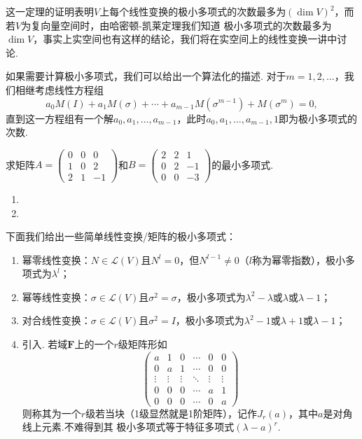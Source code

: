 这一定理的证明表明$V$上每个线性变换的极小多项式的次数最多为$(\dim V)^2$，而若$V$为复向量空间时，由哈密顿-凯莱定理我们知道
极小多项式的次数最多为$\dim V$，事实上实空间也有这样的结论，我们将在实空间上的线性变换一讲中讨论.

如果需要计算极小多项式，我们可以给出一个算法化的描述. 对于$m=1,2,\ldots$，我们相继考虑线性方程组
\[a_0M(I)+a_1M(\sigma)+\cdots+a_{m-1}M(\sigma^{m-1})+M(\sigma^m)=0,\]
直到这一方程组有一个解$a_0,a_1,\ldots,a_{m-1}$，此时$a_0,a_1,\ldots,a_{m-1},1$即为极小多项式的次数.
\begin{example} \label{ex:21:最小多项式}
    求矩阵$A=\begin{pmatrix}
        0 & 0 & 0 \\ 1 & 0 & 2 \\ 2 & 1 & -1
    \end{pmatrix}$和$B=\begin{pmatrix}
        2 & 2 & 1 \\ 0 & 2 & -1 \\ 0 & 0 & -3
    \end{pmatrix}$的最小多项式.
\end{example}
\begin{solution}
    \begin{enumerate}
        \item 
        \item 
    \end{enumerate}
\end{solution}

下面我们给出一些简单线性变换/矩阵的极小多项式：
\begin{enumerate}
    \item 幂零线性变换：$N\in \mathcal{L}(V)$且$N^l=0$，但$N^{l-1}\neq 0$（$l$称为幂零指数），极小多项式为$\lambda^l$；

    \item 幂等线性变换：$\sigma\in \mathcal{L}(V)$且$\sigma^2=\sigma$，极小多项式为$\lambda^2-\lambda$或$\lambda$或$\lambda-1$；

    \item 对合线性变换：$\sigma\in \mathcal{L}(V)$且$\sigma^2=I$，极小多项式为$\lambda^2-1$或$\lambda+1$或$\lambda-1$；

    \item 引入. 若域$\mathbf{F}$上的一个$r$级矩阵形如\[\begin{pmatrix}
        a & 1 & 0 & \cdots & 0 & 0 \\
        0 & a & 1 & \cdots & 0 & 0 \\
        \vdots & \vdots & \vdots & \ddots & \vdots & \vdots \\
        0 & 0 & 0 & \cdots & a & 1 \\
        0 & 0 & 0 & \cdots & 0 & a
    \end{pmatrix}\]
    则称其为一个$r$级若当块（1级显然就是1阶矩阵），记作$J_r(a)$，其中$a$是对角线上元素.不难得到其
    极小多项式等于特征多项式$(\lambda-a)^r$.
\end{enumerate}

